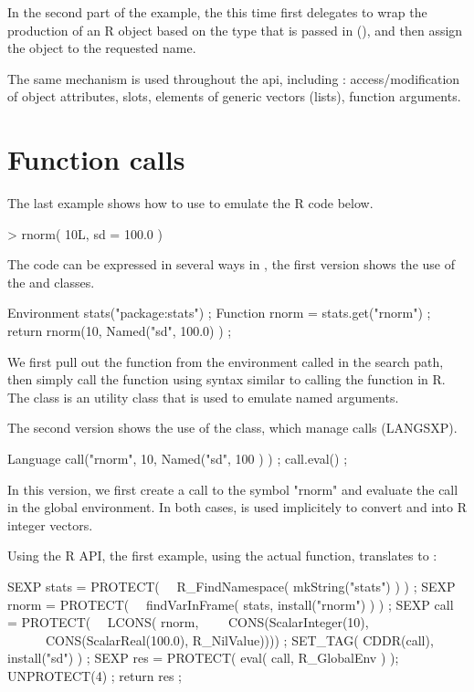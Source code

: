 In the second part of the example, the  this time 
first delegates to wrap the production of an R object based on the 
type that is passed in (), 
and then assign the object to the requested name.

The same mechanism is used throughout the api, including : access/modification
of object attributes, slots, elements of generic vectors (lists), 
function arguments. 

\section{Function calls}

The last example shows how to use  to emulate the R code below.

\begin{example}
> rnorm( 10L, sd = 100.0 )
\end{example}

The code can be expressed in several ways in , the first version
shows the use of the  and  classes. 

\begin{example}
Environment stats("package:stats") ;
Function rnorm = stats.get("rnorm") ;
return rnorm(10, Named("sd", 100.0) ) ;
\end{example}

We first pull out the  function from the environment 
called  in the search path, then simply call the function 
using syntax similar to calling the function in R. The  
class is an utility class that is used to emulate named arguments.

The second version shows the use of the  class, which 
manage calls (LANGSXP). 

\begin{example}
Language call("rnorm", 10, Named("sd", 100 ) ) ;
call.eval() ;
\end{example}

In this version, we first create a call to the symbol "rnorm" and
evaluate the call in the global environment. In both cases, 
is used implicitely to convert  and  
into R integer vectors. 

Using the R API, the first example, using the actual  function,
translates to :

\begin{example}
SEXP stats = PROTECT( 
\ \ R_FindNamespace( mkString("stats") ) ) ;
SEXP rnorm = PROTECT( 
\ \ findVarInFrame( stats, install("rnorm") ) ) ;
SEXP call  = PROTECT( 
\ \ LCONS( rnorm, 
\ \ \ \ CONS(ScalarInteger(10), 
\ \ \ \ \ \ CONS(ScalarReal(100.0), R_NilValue)))) ;
SET_TAG( CDDR(call), install("sd") ) ;
SEXP res = PROTECT( eval( call, R_GlobalEnv ) );
UNPROTECT(4) ;
return res ;
\end{example}

